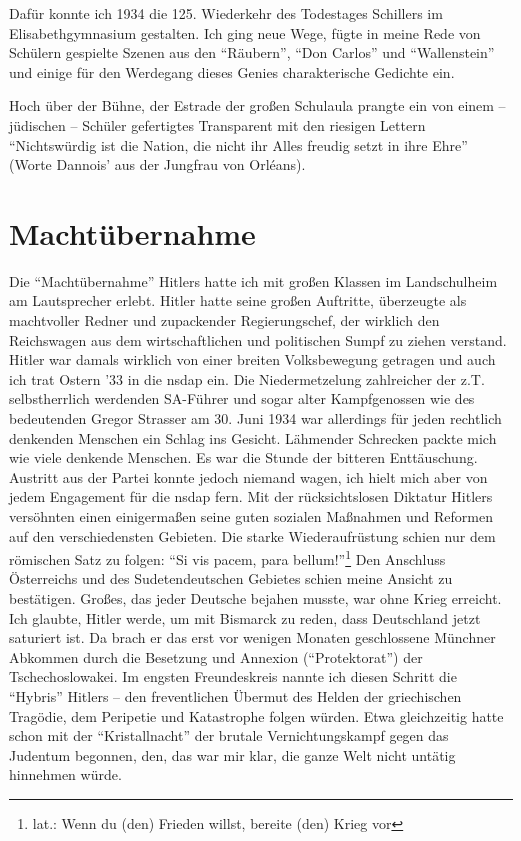 Dafür konnte ich 1934 die 125. Wiederkehr des Todestages Schillers im Elisabethgymnasium gestalten. Ich ging neue Wege, fügte in meine Rede von Schülern gespielte Szenen aus den \enquote{Räubern}, \enquote{Don Carlos} und \enquote{Wallenstein} und einige für den Werdegang dieses Genies charakterische Gedichte ein.

Hoch über der Bühne, der Estrade der großen Schulaula prangte ein von einem -- jüdischen -- Schüler gefertigtes Transparent mit den riesigen Lettern \enquote{Nichtswürdig ist die Nation, die nicht ihr Alles freudig setzt in ihre Ehre} (Worte Dannois' aus der Jungfrau von Orléans).

\section{Machtübernahme}

Die \enquote{Machtübernahme} Hitlers hatte ich mit großen Klassen im Landschulheim am Lautsprecher erlebt. Hitler hatte seine großen Auftritte, überzeugte als machtvoller Redner und zupackender Regierungschef, der wirklich den Reichswagen aus dem wirtschaftlichen und politischen Sumpf zu ziehen verstand. Hitler war damals wirklich von einer breiten Volksbewegung getragen und auch ich trat Ostern '33 in die \ac{nsdap} ein. Die Niedermetzelung zahlreicher der z.T. selbstherrlich werdenden SA-Führer und sogar alter Kampfgenossen wie des bedeutenden Gregor Strasser am 30. Juni 1934 war allerdings für jeden rechtlich denkenden Menschen ein Schlag ins Gesicht. Lähmender Schrecken packte mich wie viele denkende Menschen. Es war die Stunde der bitteren Enttäuschung. Austritt aus der Partei konnte jedoch niemand wagen, ich hielt mich aber von jedem Engagement für die \ac{nsdap} fern. Mit der rücksichtslosen Diktatur Hitlers versöhnten einen einigermaßen seine guten sozialen Maßnahmen und Reformen auf den verschiedensten Gebieten. Die starke Wiederaufrüstung schien nur dem römischen Satz zu folgen: \enquote{Si vis pacem, para bellum!}\footnote{lat.: Wenn du (den) Frieden willst, bereite (den) Krieg vor} Den Anschluss Österreichs und des Sudetendeutschen Gebietes schien meine Ansicht zu bestätigen. Großes, das jeder Deutsche bejahen musste, war ohne Krieg erreicht. Ich glaubte, Hitler werde, um mit Bismarck zu reden, dass Deutschland jetzt saturiert ist. Da brach er das erst vor wenigen Monaten geschlossene Münchner Abkommen durch die Besetzung und Annexion (\enquote{Protektorat}) der Tschechoslowakei. Im engsten Freundeskreis nannte ich diesen Schritt die \enquote{Hybris} Hitlers -- den freventlichen Übermut des Helden der griechischen Tragödie, dem Peripetie und Katastrophe folgen würden. Etwa gleichzeitig hatte schon mit der \enquote{Kristallnacht} der brutale Vernichtungskampf gegen das Judentum begonnen, den, das war mir klar, die ganze Welt nicht untätig hinnehmen würde.


